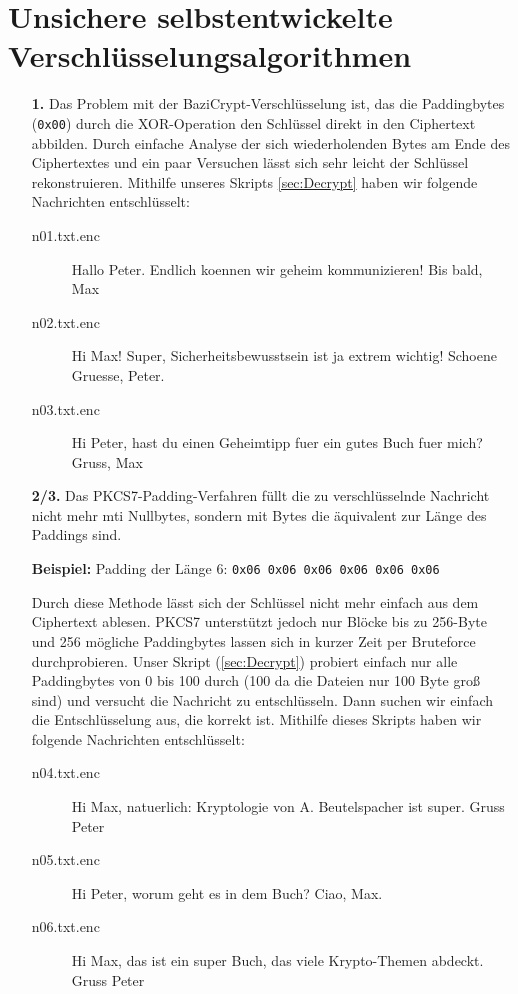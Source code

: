 \documentclass[a4paper,12bpt]{scrartcl}
\begin{document}
\section{Unsichere selbstentwickelte Verschlüsselungsalgorithmen}
\label{sec:crypto}

\begin{enumerate}
    \item[\bfseries 1.]
        Das Problem mit der BaziCrypt-Verschlüsselung ist, das die Paddingbytes (\texttt{0x00})
        durch die XOR-Operation den Schlüssel direkt in den Ciphertext abbilden. Durch einfache
        Analyse der sich wiederholenden Bytes am Ende des Ciphertextes und ein paar Versuchen
        lässt sich sehr leicht der Schlüssel rekonstruieren. Mithilfe unseres Skripts \ref{sec:Decrypt}
        haben wir folgende Nachrichten entschlüsselt:
        \begin{description}
            \item[n01.txt.enc] Hallo Peter. Endlich koennen wir geheim kommunizieren! Bis bald, Max
            \item[n02.txt.enc] Hi Max! Super, Sicherheitsbewusstsein ist ja extrem wichtig! Schoene Gruesse, Peter.
            \item[n03.txt.enc] Hi Peter, hast du einen Geheimtipp fuer ein gutes Buch fuer mich? Gruss, Max
        \end{description}
    \item[\bfseries 2/3.]
        Das PKCS7-Padding-Verfahren füllt die zu verschlüsselnde Nachricht nicht mehr mti
        Nullbytes, sondern mit Bytes die äquivalent zur Länge des Paddings sind.

        \textbf{Beispiel:} Padding der Länge 6: \texttt{0x06 0x06 0x06 0x06 0x06 0x06}

        Durch diese Methode lässt sich der Schlüssel nicht mehr einfach aus dem Ciphertext
        ablesen. PKCS7 unterstützt jedoch nur Blöcke bis zu 256-Byte und 256 mögliche Paddingbytes
        lassen sich in kurzer Zeit per Bruteforce durchprobieren. Unser Skript (\ref{sec:Decrypt})
        probiert einfach nur alle Paddingbytes von 0 bis 100 durch (100 da die Dateien nur 100 Byte
        groß sind) und versucht die Nachricht zu entschlüsseln. Dann suchen wir einfach die
        Entschlüsselung aus, die korrekt ist. Mithilfe dieses Skripts haben wir folgende Nachrichten
        entschlüsselt:
        \begin{description}
            \item[n04.txt.enc] Hi Max, natuerlich: Kryptologie von A. Beutelspacher ist super. Gruss Peter
            \item[n05.txt.enc] Hi Peter, worum geht es in dem Buch? Ciao, Max.
            \item[n06.txt.enc] Hi Max, das ist ein super Buch, das viele Krypto-Themen abdeckt. Gruss Peter
        \end{description}
\end{enumerate}
\end{document}
